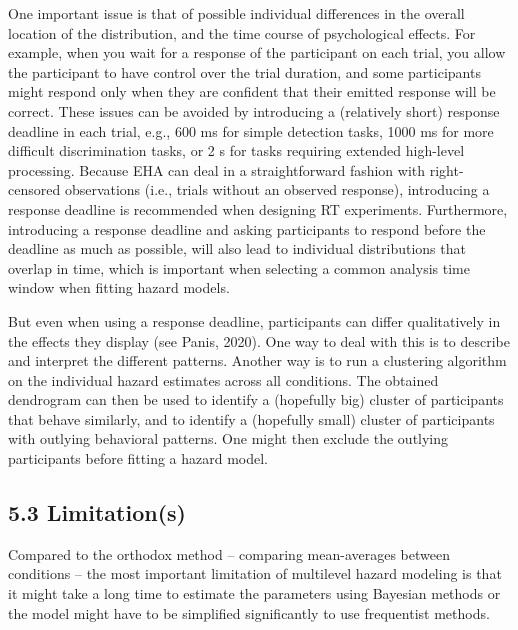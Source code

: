 \documentclass[
  man,floatsintext]{apa6}
\begin{document}
One important issue is that of possible individual differences in the overall location of the distribution, and the time course of psychological effects. For example, when you wait for a response of the participant on each trial, you allow the participant to have control over the trial duration, and some participants might respond only when they are confident that their emitted response will be correct. These issues can be avoided by introducing a (relatively short) response deadline in each trial, e.g., 600 ms for simple detection tasks, 1000 ms for more difficult discrimination tasks, or 2 s for tasks requiring extended high-level processing. Because EHA can deal in a straightforward fashion with right-censored observations (i.e., trials without an observed response), introducing a response deadline is recommended when designing RT experiments. Furthermore, introducing a response deadline and asking participants to respond before the deadline as much as possible, will also lead to individual distributions that overlap in time, which is important when selecting a common analysis time window when fitting hazard models.

But even when using a response deadline, participants can differ qualitatively in the effects they display (see Panis, 2020). One way to deal with this is to describe and interpret the different patterns. Another way is to run a clustering algorithm on the individual hazard estimates across all conditions. The obtained dendrogram can then be used to identify a (hopefully big) cluster of participants that behave similarly, and to identify a (hopefully small) cluster of participants with outlying behavioral patterns. One might then exclude the outlying participants before fitting a hazard model.

\subsection{5.3 Limitation(s)}\label{limitations}

Compared to the orthodox method -- comparing mean-averages between conditions -- the most important limitation of multilevel hazard modeling is that it might take a long time to estimate the parameters using Bayesian methods or the model might have to be simplified significantly to use frequentist methods.
\end{document}
